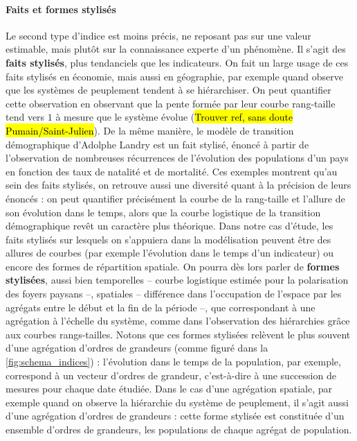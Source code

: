 \paragraph{Faits et formes stylisés}
Le second type d'indice est moins précis, ne reposant pas sur une valeur estimable, mais plutôt sur la connaissance experte d'un phénomène. Il s'agit des \og \textbf{faits stylisés}\fg{}\footnotemark{}, plus tendanciels que les indicateurs.
On fait un large usage de ces faits stylisés en économie, mais aussi en géographie, par exemple quand observe que les systèmes de peuplement tendent à se hiérarchiser.
On peut quantifier cette observation en observant que la pente formée par leur courbe rang-taille tend vers $1$ à mesure que le système évolue (\hl{Trouver ref, sans doute Pumain/Saint-Julien}).
De la même manière, le modèle de transition démographique d'Adolphe Landry est un fait stylisé, énoncé à partir de l'observation de nombreuses récurrences de l'évolution des populations d'un pays en fonction des taux de natalité et de mortalité.
Ces exemples montrent qu'au sein des faits stylisés, on retrouve aussi une diversité quant à la précision de leurs énoncés : on peut quantifier précisément la courbe de la rang-taille et l'allure de son évolution dans le temps, alors que la courbe logistique de la transition démographique revêt un caractère plus théorique.
Dans notre cas d'étude, les faits stylisés sur lesquels on s'appuiera dans la modélisation peuvent être des allures de courbes (par exemple l'évolution dans le temps d'un indicateur) ou encore des formes de répartition spatiale.
On pourra dès lors parler de \og \textbf{formes stylisées}\fg{}, aussi bien temporelles -- courbe logistique estimée pour la polarisation des foyers paysans --, spatiales -- différence dans l'occupation de l'espace par les agrégats entre le début et la fin de la période --, que correspondant à une agrégation à l'échelle du système, comme dans l'observation des hiérarchies grâce aux courbes rangs-tailles.
Notons que ces formes stylisées relèvent le plus souvent d'une agrégation d'ordres de grandeurs (comme figuré dans la \cref{fig:schema_indices}) : l'évolution dans le temps de la population, par exemple, correspond à un vecteur d'ordres de grandeur, c'est-à-dire à une succession de mesures pour chaque date étudiée. Dans le cas d'une agrégation spatiale, par exemple quand on observe la hiérarchie du système de peuplement, il s'agit aussi d'une agrégation d'ordres de grandeurs : cette forme stylisée est constituée d'un ensemble d'ordres de grandeurs, les populations de chaque agrégat de population.

